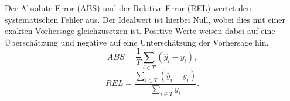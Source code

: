 %
%
Der Absolute Error (ABS) und der Relative Error (REL) wertet den systematischen Fehler aus. Der Idealwert ist hierbei Null, wobei dies mit einer exakten Vorhersage gleichzusetzen ist. Positive Werte weisen dabei auf eine Überschätzung und negative auf eine Unterschätzung der Vorhersage hin.\,
%
\begin{equation}
ABS= \frac{1}{T} \sum\limits_{i \in T} (\hat{y}_i-y_i),
\label{gl:ABS}
\end{equation}
%
%
\begin{equation}
REL= \frac{\sum_{i \in T} (\hat{y}_i-y_i)}{\sum_{i \in T} y_i} .
\label{gl:REL}
\end{equation}



%        

%        

%        

